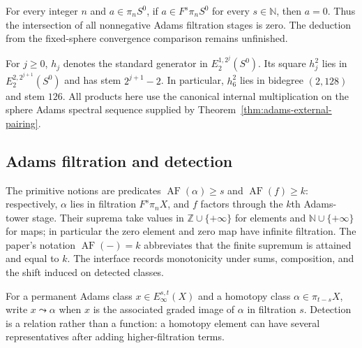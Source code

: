 \begin{proposition}
  \label{prop:fixed-sphere-adams-separated}
  \notready
  For every integer $n$ and $a\in\pi_nS^0$, if
  $a\in F^s\pi_nS^0$ for every $s\in\mathbb N$, then $a=0$.
  Thus the intersection of all nonnegative Adams filtration stages is zero.
  The deduction from the fixed-sphere convergence comparison remains
  unfinished.
\end{proposition}

\begin{definition}
  \label{def:adams-hj}
  \notready
  For $j\ge0$, $h_j$ denotes the standard generator in
  $E_2^{1,2^j}(S^0)$.  Its square $h_j^2$ lies in
  $E_2^{2,2^{j+1}}(S^0)$ and has stem $2^{j+1}-2$.  In particular,
  $h_6^2$ lies in bidegree $(2,128)$ and stem $126$.  All products here use
  the canonical internal multiplication on the sphere Adams spectral sequence
  supplied by Theorem~\ref{thm:adams-external-pairing}.
\end{definition}

\subsection{Adams filtration and detection}

\begin{definition}
  \label{def:adams-filtration}
  \notready
  The primitive notions are predicates $\operatorname{AF}(\alpha)\ge s$ and
  $\operatorname{AF}(f)\ge k$: respectively, $\alpha$ lies in filtration
  $F^s\pi_nX$, and $f$ factors through the $k$th Adams-tower stage.  Their
  suprema take values in $\mathbb Z\cup\{+\infty\}$ for elements and
  $\mathbb N\cup\{+\infty\}$ for maps; in particular the zero element and zero
  map have infinite filtration.  The paper's notation
  $\operatorname{AF}(-)=k$ abbreviates that the finite supremum is attained
  and equal to $k$.  The interface records monotonicity under sums,
  composition, and the shift induced on detected classes.
\end{definition}

\begin{definition}
  \label{def:adams-detection}
  \notready
  For a permanent Adams class $x\in E_\infty^{s,t}(X)$ and a homotopy class
  $\alpha\in\pi_{t-s}X$, write $x\leadsto\alpha$ when $x$ is the associated
  graded image of $\alpha$ in filtration $s$.  Detection is a relation rather
  than a function: a homotopy element can have several representatives after
  adding higher-filtration terms.
\end{definition}
